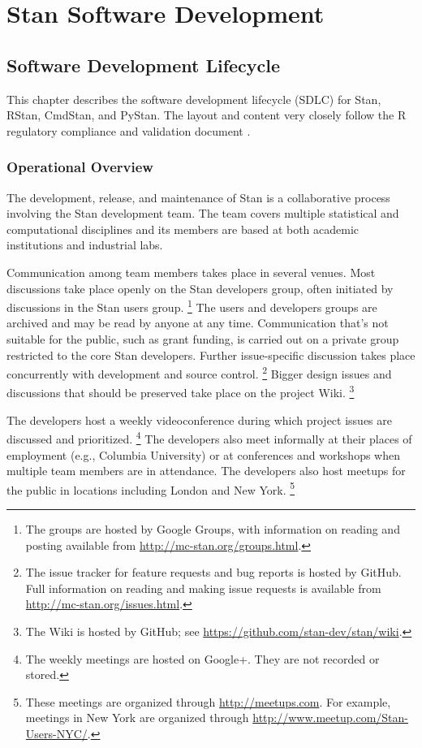 \part{Stan Software Development}

\chapter{Software Development Lifecycle}\label{software-development.chapter}

This chapter describes the software development lifecycle (SDLC) for
Stan, RStan, CmdStan, and PyStan. The layout and content very closely
follow the R regulatory compliance and validation document
\citep[Section~6]{RProject:2014}.

\section{Operational Overview}

The development, release, and maintenance of Stan is a collaborative
process involving the Stan development team.  The team covers multiple
statistical and computational disciplines and its members are based at
both academic institutions and industrial labs.

Communication among team members takes place in several venues.  Most
discussions take place openly on the Stan developers group, often
initiated by discussions in the Stan users group.%
%
\footnote{The groups are hosted by Google Groups, with information on
  reading and posting available from \url{http://mc-stan.org/groups.html}.}
%
The users and developers groups are archived and may be read by
anyone at any time. Communication that's not suitable for the public,
such as grant funding, is carried out on a private group restricted to
the core Stan developers. Further issue-specific discussion takes
place concurrently with development and source control.%
%
\footnote{The issue tracker for feature requests and bug reports is
  hosted by GitHub.  Full information on reading and making issue
  requests is available from \url{http://mc-stan.org/issues.html}.}
%
Bigger design issues and discussions that should be preserved take
place on the project Wiki.%
%
\footnote{The Wiki is hosted by GitHub; see
  \url{https://github.com/stan-dev/stan/wiki}.}

The developers host a weekly videoconference during which project
issues are discussed and prioritized.%
%
\footnote{The weekly meetings are hosted on Google+.  They are not
  recorded or stored.}
%
The developers also meet informally at their places of employment
(e.g., Columbia University) or at conferences and workshops when
multiple team members are in attendance.  The developers also host
meetups for the public in locations including London and New York.%
%
\footnote{These meetings are organized through
  \url{http://meetups.com}.  For example, meetings in New York are
  organized through \url{http://www.meetup.com/Stan-Users-NYC/}.}

